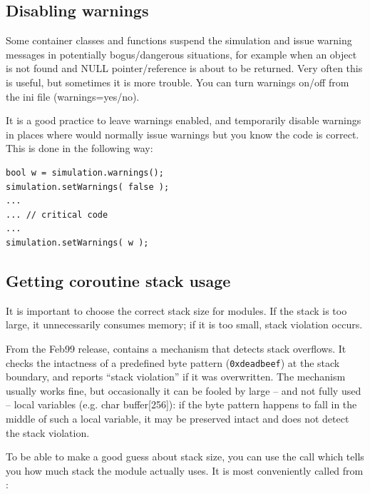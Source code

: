\subsection{Disabling warnings}

Some container classes and functions suspend the simulation and issue
warning messages in potentially bogus/dangerous situations, for
example when an object is not found and NULL pointer/reference is
about to be returned. Very often this is useful, but sometimes it is
more trouble. You can turn warnings on/off from the ini file
(warnings=yes/no).


It is a good practice to leave warnings enabled, and
temporarily disable warnings in places where {\opp} would normally
issue warnings but you know the code is correct. This is done in the
following way:

\begin{verbatim}
bool w = simulation.warnings();
simulation.setWarnings( false );
...
... // critical code
...
simulation.setWarnings( w );
\end{verbatim}





\subsection{Getting coroutine stack usage}

It is important to choose the correct stack size for
modules.  If the stack is
too large, it unnecessarily consumes memory; if it is too small, stack
violation occurs.

From the Feb99 release, {\opp} contains a mechanism that detects stack
overflows. It checks the intactness of a
predefined byte pattern (\texttt{0xdeadbeef}) at the stack boundary,
and reports ``stack violation'' if it was
overwritten. The mechanism usually works fine, but occasionally it can
be fooled by large -- and not fully used -- local variables (e.g. char
buffer[256]): if the byte pattern happens to fall in the middle of
such a local variable, it may be preserved intact and {\opp} does not
detect the stack violation.

To be able to make a good guess about stack size, you can use
the  call which tells you how much stack the module
actually uses. It is most conveniently called from :

